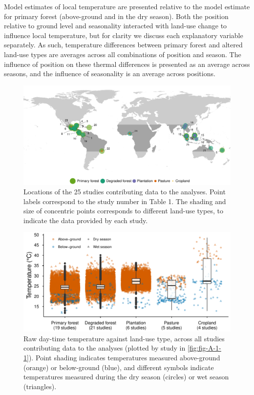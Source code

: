 \documentclass[12pt,a4paper,]{report}
\theoremstyle{definition}
\theoremstyle{definition}
\theoremstyle{definition}
\theoremstyle{remark}
\begin{document}
Model estimates of local temperature are presented relative to the model
estimate for primary forest (above-ground and in the dry season). Both
the position relative to ground level and seasonality interacted with
land-use change to influence local temperature, but for clarity we
discuss each explanatory variable separately. As such, temperature
differences between primary forest and altered land-use types are
averages across all combinations of position and season. The influence
of position on these thermal differences is presented as an average
across seasons, and the influence of seasonality is an average across
positions.

\begin{figure}
\includegraphics{./output/fig-2-1-1} \caption{Locations of the 25 studies contributing data to the analyses. Point labels correspond to the study number in  Table 1. The shading and size of concentric points corresponds to different land-use types, to indicate the data provided by each study.}\label{fig:fig-2-1}
\end{figure}

\begin{figure}
\centering
\includegraphics{figs/fig2.2.pdf}
\caption{\label{fig:fig-2-2}Raw day-time temperature against land-use type, across all studies contributing data to the analyses (plotted by study in \autoref{fig:fig-A-1-1}). Point shading indicates temperatures measured above-ground (orange) or below-ground (blue), and different symbols indicate temperatures measured during the dry season (circles) or wet season (triangles).}
\end{figure}
\end{document}
